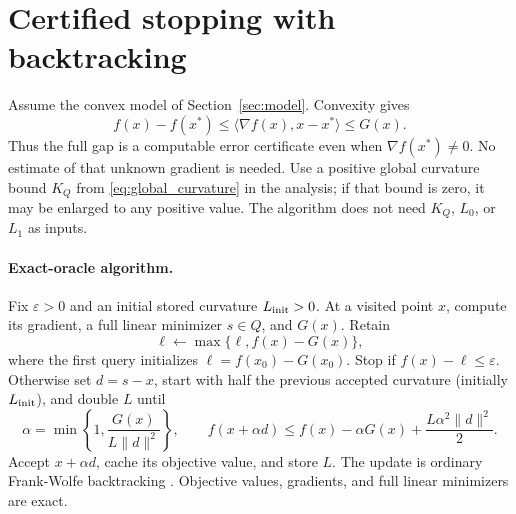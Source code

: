 \section{Certified stopping with backtracking}
\label{sec:stopping}
Assume the convex model of Section~\ref{sec:model}. Convexity gives
\begin{equation}\label{eq:gap_certificate}
 f(x)-f(x^*)\le
 \langle\nabla f(x),x-x^*\rangle\le G(x).
\end{equation}
Thus the full gap is a computable error certificate even when
$\nabla f(x^*)\ne0$. No estimate of that unknown gradient is needed.
Use a positive global curvature bound $K_Q$ from
\eqref{eq:global_curvature} in the analysis; if that bound is zero,
it may be enlarged to any positive value. The algorithm does not
need $K_Q$, $L_0$, or $L_1$ as inputs.

\paragraph{Exact-oracle algorithm.}
Fix $\varepsilon>0$ and an initial stored curvature $L_{\rm init}>0$.
At a visited point $x$, compute its gradient, a full linear minimizer
$s\in Q$, and $G(x)$. Retain
\[
 \ell\leftarrow\max\{\ell,f(x)-G(x)\},
\]
where the first query initializes $\ell=f(x_0)-G(x_0)$.
Stop if $f(x)-\ell\le\varepsilon$. Otherwise set $d=s-x$, start with
half the previous accepted curvature (initially $L_{\rm init}$),
and double $L$ until
\begin{equation}\label{eq:stopping_bt}
 \alpha=\min\left\{1,\frac{G(x)}{L\|d\|^2}\right\},\qquad
 f(x+\alpha d)\le f(x)-\alpha G(x)+\frac{L\alpha^2\|d\|^2}{2}.
\end{equation}
Accept $x+\alpha d$, cache its objective value, and store $L$.
The update is ordinary Frank-Wolfe backtracking \cite{pedregosa}.
Objective values, gradients, and full linear minimizers are exact.

